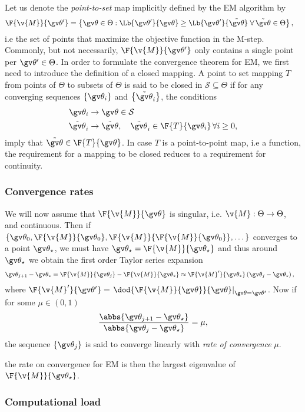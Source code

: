 Let us denote the \emph{point-to-set} map implicitly defined by the EM
algorithm by 
\begin{align}
	\F{\v{M}}{\Th'}&=\left\{\Th\in\Theta : \Lb{\Th'}{\Th} \geq \Lb{\Th'}{\tilde\Th}\; \forall \,\tilde\Th\in\Theta \right\},
\end{align}
i.e the set of points that maximize the objective function in the M-step. 
Commonly, but not necessarily, $\F{\v{M}}{\Th'}$ only contains a single point per $\Th'\in\Theta$.
In order to formulate the convergence theorem for EM, we first need to introduce the definition
of a closed mapping. A point to set mapping $T$ from points of $\Theta$ to subsets of $\Theta$
is said to be closed in $\mathcal{S}\subseteq \Theta$ if for any converging sequences
$\left\{\Th_i\right\}$ and $\left\{\tilde\Th_i\right\}$, the conditions 
\begin{align}
\Th_i&\to\Th\in\mathcal{S}\\
\tilde\Th_i&\to\tilde\Th,\quad \tilde\Th_i\in\F{T}{\Th_i}\,\forall i \geq 0,
\end{align}
imply that $\tilde\Th\in\F{T}{\Th}$. In case $T$ is a point-to-point map, i.e a function,
the requirement for a mapping to be closed reduces to a requirement for continuity.

\subsubsection{Convergence rates}

We will now assume that $\F{\v{M}}{\Th}$ is singular, i.e.
$\v{M}:\Theta\to\Theta$, and continuous. Then if $\left\{\Th_0,\F{\v{M}}{\Th_0},\F{\v{M}}{\F{\v{M}}{\Th_0}},\dots\right\}$
converges to a point $\Th_\star$, we must have $\Th_\star=\F{\v{M}}{\Th_\star}$ and
thus around $\Th_\star$ we obtain the first order Taylor series expansion
\begin{align}
	\Th_{j+1}-\Th_\star&=\F{\v{M}}{\Th_j}-\F{\v{M}}{\Th_\star}\approx\F{\v{M}'}{\Th_\star}\left(\Th_j-\Th_\star\right),
\end{align} 
where $\F{\v{M}'}{\Th'}=\left.\dod{\F{\v{M}}{\Th}}{\Th}\right|_{\Th=\Th'}$.
Now if for some $\mu\in\left(0,1\right)$ 
\begin{align}
	\frac{\abbs{\Th_{j+1}-\Th_\star}}{\abbs{\Th_{j}-\Th_\star}}=\mu,
\end{align}
the sequence $\left\{\Th_j\right\}$ is said to converge linearly with 
\emph{rate of convergence} $\mu$.
 
the rate on convergence for EM is then the largest eigenvalue of $\F{\v{M}}{\Th_\star}$.

\parencite{Wu1983,Sandell1978,Meng1997,Elliott1999,Salakhutdinov2003a,Salakhutdinov2003,Olsson2007,Paninski2010}

\subsubsection{Computational load}

\parencite{Harvey1990,Watson1983,Cappe2005,Saatci2011,Olsson2007,Salakhutdinov2003a}


